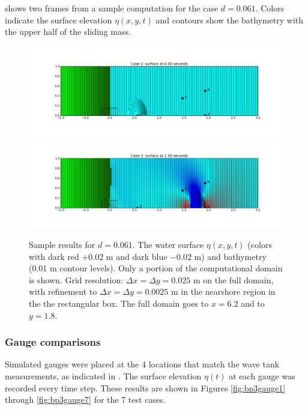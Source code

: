  shows two frames from
a sample computation for the case $d=0.061$. Colors indicate the surface
elevation $\eta(x,y,t)$ and contours show the bathymetry with the upper half
of the sliding mass.  


\begin{figure}[ht]

\hfil\includegraphics[width=5.8in]{bp3/frame0.png}\hfil
\vskip 10pt
\hfil\includegraphics[width=5.8in]{bp3/frame6.png}\hfil

\caption{\label{fig:bp3eta} 
Sample results for $d=0.061$.  The water surface $\eta(x,y,t)$
(colors with dark red $+0.02$ m and dark blue $-0.02$ m) and bathymetry
(0.01 m contour levels).
Only a portion of the computational domain is shown.
Grid resolution: $\Delta x = \Delta y = 0.025$ m on the full domain,
with refinement to $\Delta x = \Delta y = 0.0025$ m 
in the nearshore region in the
the rectangular box.  The full domain goes to $x = 6.2$ and to $y=1.8$.
  }
\end{figure}



\subsubsection{Gauge comparisons}

Simulated gauges were placed at the 4 locations that match the wave tank
measurements, as indicated in .
The surface elevation $\eta(t)$ at each gauge was recorded every time step.
These results are shown in Figures \ref{fig:bp3gauge1} through \ref{fig:bp3gauge7}
for the 7 test cases.

